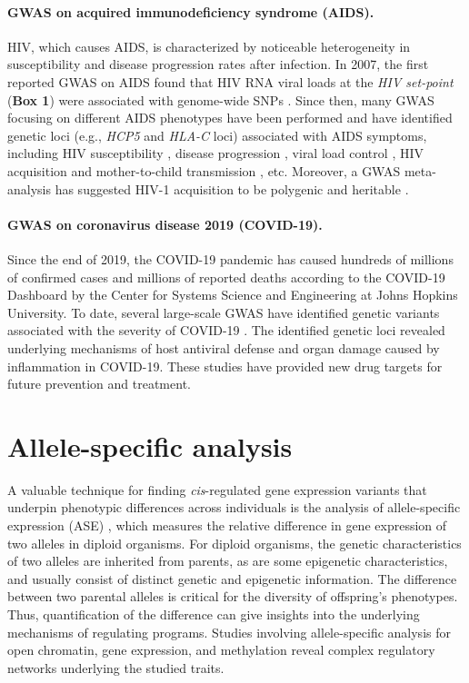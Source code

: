 \documentclass{book}
\begin{document}
\begin{refsection}
\paragraph*{GWAS on acquired immunodeficiency syndrome (AIDS).} HIV, which causes AIDS, is characterized by noticeable heterogeneity in susceptibility and disease progression rates after infection.
In 2007, the first reported GWAS on AIDS found that HIV RNA viral loads at the \textit{HIV set-point} (\textbf{Box 1}) were associated with genome-wide SNPs \cite{Fellay2007A}.
Since then, many GWAS focusing on different AIDS phenotypes have been performed and have identified genetic loci (e.g., \textit{HCP5} and \textit{HLA-C} loci) associated with AIDS symptoms, including HIV susceptibility \cite{Petrovski2011Common,Luo2012A}, disease progression \cite{Herbeck2010Multistage,van2011Genome}, viral load control \cite{Fellay2007A,McLaren2015Polymorphisms,Fellay2009Common}, HIV acquisition and mother-to-child transmission \cite{McLaren2013Association,Joubert2010A}, etc.
Moreover, a GWAS meta-analysis has suggested HIV-1 acquisition to be polygenic and heritable \cite{Powell2020The}.

\paragraph*{GWAS on coronavirus disease 2019 (COVID-19).} Since the end of 2019, the COVID-19 pandemic has caused hundreds of millions of confirmed cases and millions of reported deaths according to the COVID-19 Dashboard by the Center for Systems Science and Engineering at Johns Hopkins University.
To date, several large-scale GWAS have identified genetic variants associated with the severity of COVID-19 \cite{Pairo2020Genetic,Niemi2021Mapping,Shelton2021Trans,Author2020Genomewide}.
The identified genetic loci revealed underlying mechanisms of host antiviral defense and organ damage caused by inflammation in COVID-19.
These studies have provided new drug targets for future prevention and treatment.


\section*{Allele-specific analysis}
A valuable technique for finding \textit{cis}-regulated gene expression variants that underpin phenotypic differences across individuals is the analysis of allele-specific expression (ASE) \cite{Fan2020ASEP}, which measures the relative difference in gene expression of two alleles in diploid organisms.
For diploid organisms, the genetic characteristics of two alleles are inherited from parents, as are some epigenetic characteristics, and usually consist of distinct genetic and epigenetic information.
The difference between two parental alleles is critical for the diversity of offspring's phenotypes.
Thus, quantification of the difference can give insights into the underlying mechanisms of regulating programs.
Studies involving allele-specific analysis for open chromatin, gene expression, and methylation reveal complex regulatory networks underlying the studied traits.


\end{refsection}
\end{document}
